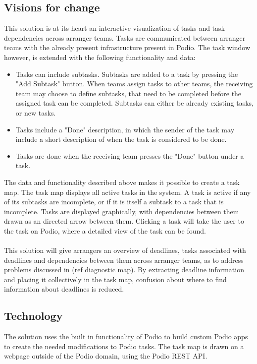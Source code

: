 \subsection{Visions for change}
\label{visions_for_change}
This solution is at its heart an interactive visualization of tasks and task dependencies across arranger teams. Tasks are communicated between arranger teams with the already present infrastructure present in Podio. The task window however, is extended with the following functionality and data:
\begin{itemize}
    \item Tasks can include subtasks. Subtasks are added to a task by pressing the "Add Subtask" button. When teams assign tasks to other teams, the receiving team may choose to define subtasks, that need to be completed before the assigned task can be completed. Subtasks can either be already existing tasks, or new tasks.
    \item Tasks include a "Done" description, in which the sender of the task may include a short description of when the task is considered to be done.
    \item Tasks are done when the receiving team presses the "Done" button under a task.
\end{itemize}
The data and functionality described above makes it possible to create a task map. The task map displays all active tasks in the system. A task is active if any of its subtasks are incomplete, or if it is itself a subtask to a task that is incomplete. Tasks are displayed graphically, with dependencies between them drawn as an directed arrow between them. Clicking a task will take the user to the task on Podio, where a detailed view of the task can be found. 
\\ \\
This solution will give arrangers an overview of deadlines, tasks associated with deadlines and dependencies between them across arranger teams, as to address problems discussed in (ref diagnostic map). By extracting deadline information and placing it collectively in the task map, confusion about where to find information about deadlines is reduced.


\subsection{Technology}
\label{sub:technology}
The solution uses the built in functionality of Podio to build custom Podio apps to create the needed modifications to Podio tasks. The task map is drawn on a webpage outside of the Podio domain, using the Podio REST API.

